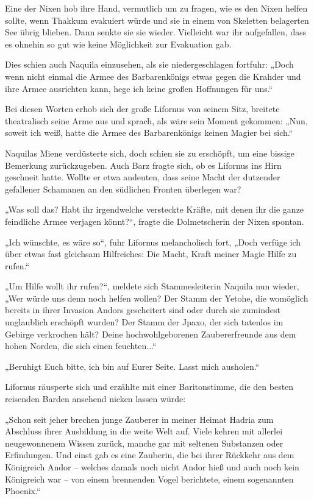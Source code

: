 Eine der Nixen hob ihre Hand, vermutlich um zu fragen, wie es den Nixen helfen sollte, wenn Thakkum evakuiert würde und sie in einem von Skeletten belagerten See übrig blieben. Dann senkte sie sie wieder. Vielleicht war ihr aufgefallen, dass es ohnehin so gut wie keine Möglichkeit zur Evakuation gab.

Dies schien auch Naquila einzusehen, als sie niedergeschlagen fortfuhr: „Doch wenn nicht einmal die Armee des Barbarenkönigs etwas gegen die Krahder und ihre Armee ausrichten kann, hege ich keine großen Hoffnungen für uns.“

Bei diesen Worten erhob sich der große Lifornus von seinem Sitz, breitete theatralisch seine Arme aus und sprach, als wäre sein Moment gekommen: „Nun, soweit ich weiß, hatte die Armee des Barbarenkönigs keinen Magier bei sich.“

Naquilas Miene verdüsterte sich, doch schien sie zu erschöpft, um eine bissige Bemerkung zurückzugeben. Auch Barz fragte sich, ob es Lifornus ins Hirn geschneit hatte. Wollte er etwa andeuten, dass seine Macht der dutzender gefallener Schamanen an den südlichen Fronten überlegen war?

„Was soll das? Habt ihr irgendwelche versteckte Kräfte, mit denen ihr die ganze feindliche Armee verjagen könnt?“, fragte die Dolmetscherin der Nixen spontan.

„Ich wünschte, es wäre so“, fuhr Lifornus melancholisch fort, „Doch verfüge ich über etwas fast gleichsam Hilfreiches: Die Macht, Kraft meiner Magie Hilfe zu rufen.“

„Um Hilfe wollt ihr rufen?“, meldete sich Stammesleiterin Naquila nun wieder, „Wer würde uns denn noch helfen wollen? Der Stamm der Yetohe, die womöglich bereits in ihrer Invasion Andors gescheitert sind oder durch sie zumindest unglaublich erschöpft wurden? Der Stamm der Jpaxo, der sich tatenlos im Gebirge verkrochen hält? Deine hochwohlgeborenen Zaubererfreunde aus dem hohen Norden, die sich einen feuchten...“

„Beruhigt Euch bitte, ich bin auf Eurer Seite. Lasst mich ausholen.“

Lifornus räusperte sich und erzählte mit einer Baritonstimme, die den besten reisenden Barden ansehend nicken lassen würde:

„Schon seit jeher brechen junge Zauberer in meiner Heimat Hadria zum Abschluss ihrer Ausbildung in die weite Welt auf. Viele kehren mit allerlei neugewonnenem Wissen zurück, manche gar mit seltenen Substanzen oder Erfindungen. Und einst gab es eine Zauberin, die bei ihrer Rückkehr aus dem Königreich Andor – welches damals noch nicht Andor hieß und auch noch kein Königreich war – von einem brennenden Vogel berichtete, einem sogenannten Phoenix.“

